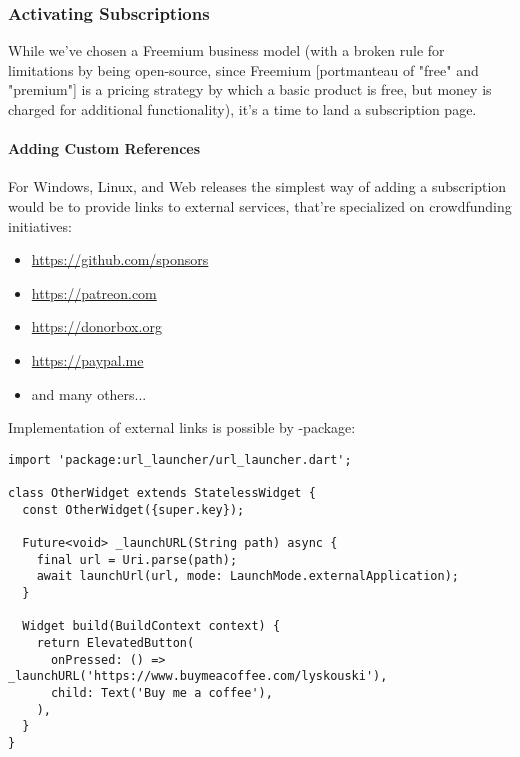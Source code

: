 
\subsubsection{Activating Subscriptions}

While we've chosen a Freemium business model (with a broken rule for limitations by being open-source, since Freemium 
[portmanteau of "free" and "premium"] is a pricing strategy by which a basic product is free, but money is charged for 
additional functionality), it's a time to land a subscription page.


\paragraph{Adding Custom References}

For Windows, Linux, and Web releases the simplest way of adding a subscription would be to provide links to external 
services, that're specialized on crowdfunding initiatives:

\begin{itemize}
  \item  \href{https://github.com/sponsors}{https://github.com/sponsors}
  \item  \href{https://patreon.com}{https://patreon.com}
  \item  \href{https://donorbox.org}{https://donorbox.org}
  \item  \href{https://paypal.me}{https://paypal.me}
  \item  and many others...
\end{itemize}

\noindent Implementation of external links is possible by -package:

\begin{lstlisting}
import 'package:url_launcher/url_launcher.dart';

class OtherWidget extends StatelessWidget {
  const OtherWidget({super.key});

  Future<void> _launchURL(String path) async {
    final url = Uri.parse(path);
    await launchUrl(url, mode: LaunchMode.externalApplication);
  }

  Widget build(BuildContext context) {
    return ElevatedButton(
      onPressed: () => _launchURL('https://www.buymeacoffee.com/lyskouski'),
      child: Text('Buy me a coffee'),
    ),
  }
}
\end{lstlisting}


